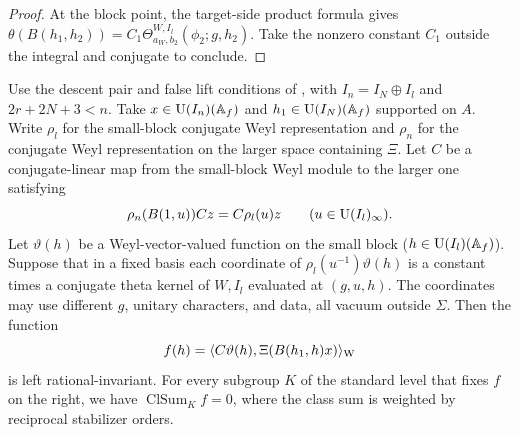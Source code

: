 \begin{proof}
At the block point, the target-side product formula gives $\theta(B(h_1,h_2))=C_1\Theta^{W,I_l}_{a_W,b_2}(\phi_2;g,h_2)$. Take the nonzero constant $C_1$ outside the integral and conjugate to conclude.
\end{proof}

\begin{lemma}
\label{lem:c-false-class-period}
\emitthmsource
Use the descent pair and false lift conditions of , with $I_n=I_N\oplus I_l$ and $2r+2N+3<n$. Take $x\in \operatorname{U}(I_n)(\mathbb A_f)$ and $h_1\in \operatorname{U}(I_N)(\mathbb A_f)$ supported on $A$. Write $\rho_l$ for the small-block conjugate Weyl representation and $\rho_n$ for the conjugate Weyl representation on the larger space containing $\Xi$. Let $C$ be a conjugate-linear map from the small-block Weyl module to the larger one satisfying
\[
 \rho_n(B(1,u))Cz=C\rho_l(u)z
 \qquad (u\in \operatorname{U}(I_l)_\infty).
\]
Let $\vartheta(h)$ be a Weyl-vector-valued function on the small block ($h\in \operatorname{U}(I_l)(\mathbb A_f)$). Suppose that in a fixed basis each coordinate of $\rho_l(u^{-1})\vartheta(h)$ is a constant times a conjugate theta kernel of $W,I_l$ evaluated at $(g,u,h)$. The coordinates may use different $g$, unitary characters, and data, all vacuum outside $\Sigma$. Then the function
\[
 f(h)=\langle C\vartheta(h),\Xi(B(h_1,h)x)\rangle_{\rm W}
\]
is left rational-invariant. For every subgroup $K$ of the standard level that fixes $f$ on the right, we have $\operatorname{ClSum}_{K}f=0$, where the class sum is weighted by reciprocal stabilizer orders.
\end{lemma}

